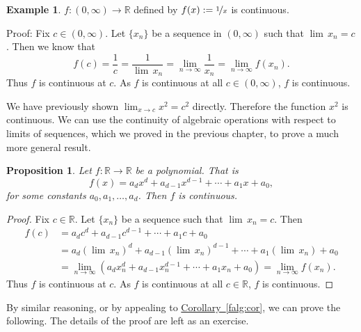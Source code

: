 \documentclass[12pt]{book}
\newcommand{\R}{{\mathbb{R}}}
\newcommand{\myindex}[1]{#1\index{#1}}
\theoremstyle{plain}
\newtheorem{prop}[thm]{Proposition}
\theoremstyle{remark}
\theoremstyle{definition}
\theoremstyle{exercise}
\theoremstyle{example}
\newtheorem{example}[thm]{Example}
\newcommand{\corref}[1]{\hyperref[#1]{Corollary~\ref*{#1}}}
\begin{document}
\begin{example}
$f \colon (0,\infty) \to \R$ defined by
$f(x) := \nicefrac{1}{x}$ is continuous.

Proof: Fix $c \in (0,\infty)$.  
Let $\{ x_n \}$ be a sequence in $(0,\infty)$ such that
$\lim\, x_n = c$.  Then we know that
\begin{equation*}
f(c) = \frac{1}{c}
=
\frac{1}{\lim\, x_n}
=
\lim_{n \to \infty} \frac{1}{x_n}
=
\lim_{n \to \infty} f(x_n) .
\end{equation*}
Thus $f$ is continuous at $c$.  As $f$ is continuous at all $c \in
(0,\infty)$, $f$ is continuous.
\end{example}

We have previously shown $\lim_{x \to c} x^2 = c^2$ directly.  Therefore
the function $x^2$ is continuous.  We can use the continuity of
algebraic operations with respect to limits of sequences, which we proved in
the previous chapter, to prove a much more general result.

\begin{prop}
Let $f \colon \R \to \R$ be a \emph{\myindex{polynomial}}.  That is
\begin{equation*}
f(x) = a_d x^d + a_{d-1} x^{d-1} + \cdots + a_1 x + a_0 ,
\end{equation*}
for some constants $a_0, a_1, \ldots, a_d$.
Then $f$ is continuous.
\end{prop}

\begin{proof}
Fix $c \in \R$.  
Let $\{ x_n \}$ be a sequence such that
$\lim\, x_n = c$.  Then
\begin{equation*}
\begin{split}
f(c) &=
a_d c^d + a_{d-1} c^{d-1} + \cdots + a_1 c + a_0 
\\
&= 
a_d {(\lim\, x_n)}^d + a_{d-1} {(\lim\, x_n)}^{d-1} + \cdots + a_1 (\lim\, x_n) + a_0 
\\
& =
\lim_{n \to \infty}
\left(
a_d x_n^d + a_{d-1} x_n^{d-1} + \cdots + a_1 x_n + a_0 
\right)
=
\lim_{n \to \infty}
f(x_n) .
\end{split}
\end{equation*}
Thus $f$ is continuous at $c$.  As $f$ is continuous at all $c \in \R$,
$f$ is continuous.
\end{proof}

By similar reasoning, or by appealing to \corref{falg:cor},
we can prove the following.  The details of the proof are left as an
exercise.
\end{document}
